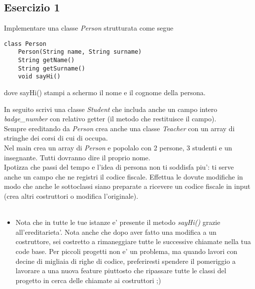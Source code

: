 \documentclass{article}
\begin{document}
\newpage

\subsection*{Esercizio 1}
Implementare una classe \textit{Person} strutturata come segue
\begin{verbatim}
class Person
    Person(String name, String surname)
    String getName()
    String getSurname()
    void sayHi()
\end{verbatim}
dove sayHi() stampi a schermo il nome e il cognome della persona.
 
In seguito scrivi una classe \textit{Student} che includa anche un campo intero
\textit{badge\_number} con relativo getter (il metodo che restituisce il
campo).\\
Sempre ereditando da \textit{Person} crea anche una classe \textit{Teacher} con
un array di stringhe dei corsi di cui di occupa. \\
Nel main crea un array di \textit{Person} e popolalo con 2 persone, 3 studenti e
un insegnante. Tutti dovranno dire il proprio nome. \\
Ipotizza che passi del tempo e l'idea di persona non ti soddisfa piu': ti serve
anche un campo che ne registri il codice fiscale. Effettua le dovute modifiche
in modo che anche le sottoclassi siano preparate a ricevere un codice fiscale in
input (crea altri costruttori o modifica l'originale). \\ \\
\begin{itemize}
    \item Nota che in tutte le tue istanze e' presente il metodo \textit{sayHi()} grazie
all'ereditarieta'. Nota anche che dopo aver fatto una modifica a un costruttore,
sei costretto a rimaneggiare tutte le successive chiamate nella tua code base.
Per piccoli progetti non e' un problema, ma quando lavori con decine di migliaia
di righe di codice, preferiresti spendere il pomeriggio a lavorare a una nuova
feature piuttosto che ripassare tutte le classi del progetto in cerca delle
chiamate ai costruttori ;)
\end{itemize}
\end{document}
